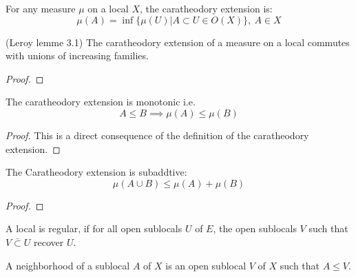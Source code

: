 \begin{definition}[Caratheodory]
    \leanok
    \label{def:caratheodory}
    For any measure $\mu$ on a local $X$, the caratheodory extension is:
    \[\mu(A) = \inf \{\mu(U) | A \subset U \in O(X)\},~A\in X\]
\end{definition}

\begin{lemma}
(Leroy lemme 3.1)
    \label{lem:commutes_with_sup}
    \leanok
    The caratheodory extension of a measure on a local commutes with unions of increasing families.
\end{lemma}
\begin{proof}
    \leanok
\end{proof}

\begin{lemma}
    \label{lem:monotonic}
    \leanok
    The caratheodory extension is monotonic i.e. \[A \le B \implies \mu(A) \le \mu(B)\]
\end{lemma}
\begin{proof}
    \leanok
    This is a direct consequence of the definition of the caratheodory extension.
\end{proof}

\begin{lemma}[Subadditivity]
    \label{lem:caratheodory_subaddtive}
    The Caratheodory extension is subaddtive:
    $$\mu(A \cup B) \le \mu(A) + \mu(B)$$
    \leanok
\end{lemma}
\begin{proof}
    \leanok
\end{proof}

\begin{definition}
    \label{def:regular_local}
    \leanok
    A local is regular, if for all open sublocals $U$ of $E$, the open sublocals $V$ such that $V\bar \subset U$ recover $U$.
\end{definition}



\begin{definition}[Neighborhood]
    \label{def:neighborhood}
    \leanok

    A neighborhood of a sublocal $A$ of $X$ is an open sublocal $V$ of $X$ such that $A \le V$.
\end{definition}

